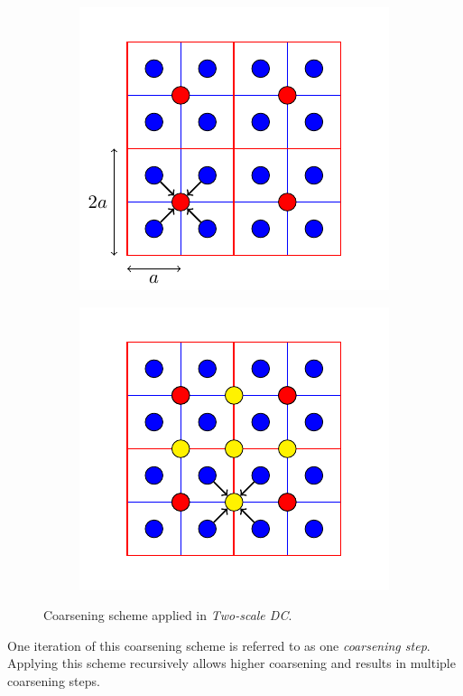 \begin{figure}
\begin{subfigure}{.45\textwidth}
\begin{center}
\includegraphics[scale=1]{Pictures/tikzCoarsen/coarsen.pdf}
\end{center}
\label{sfig:coarsenA}
\end{subfigure}\hfill
\begin{subfigure}{.45\textwidth}
\begin{center}
\includegraphics[scale=1]{Pictures/tikzCoarsen/coarsenMani.pdf}
\end{center}
\label{sfig:coarsenB}
\end{subfigure}
\caption{Coarsening scheme applied in \emph{Two-scale \acl{DC}}.}
\label{fig:coarsen}
\end{figure}
One iteration of this coarsening scheme is referred to as one \emph{coarsening step}. Applying this scheme recursively allows higher coarsening and results in multiple coarsening steps.

